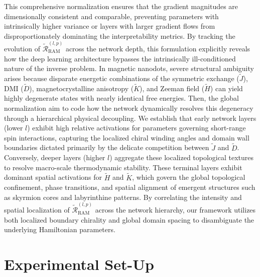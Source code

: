 \documentclass[a4paper,fleqn]{cas-sc}
\begin{document}
This comprehensive normalization ensures that the gradient magnitudes are dimensionally consistent and comparable, preventing parameters with intrinsically higher variance or layers with larger gradient flows from disproportionately dominating the interpretability metrics. By tracking the evolution of $\tilde{\mathcal{R}}_{\text{RAM}}^{(l,p)}$ across the network depth, this formulation explicitly reveals how the deep learning architecture bypasses the intrinsically ill-conditioned nature of the inverse problem. In magnetic nanodots, severe structural ambiguity arises because disparate energetic combinations of the symmetric exchange ($\tilde{J}$), DMI ($\tilde{D}$), magnetocrystalline anisotropy ($\tilde{K}$), and Zeeman field ($\tilde{H}$) can yield highly degenerate states with nearly identical free energies. Then, the global normalization aim to code how the network dynamically resolves this degeneracy through a hierarchical physical decoupling. We establish that early network layers (lower $l$) exhibit high relative activations for parameters governing short-range spin interactions, capturing the localized chiral winding angles and domain wall boundaries dictated primarily by the delicate competition between $\tilde{J}$ and $\tilde{D}$. Conversely, deeper layers (higher $l$) aggregate these localized topological textures to resolve macro-scale thermodynamic stability. These terminal layers exhibit dominant spatial activations for $\tilde{H}$ and $\tilde{K}$, which govern the global topological confinement, phase transitions, and spatial alignment of emergent structures such as skyrmion cores and labyrinthine patterns. By correlating the intensity and spatial localization of $\tilde{\mathcal{R}}_{\text{RAM}}^{(l,p)}$ across the network hierarchy, our framework utilizes both localized boundary chirality and global domain spacing to disambiguate the underlying Hamiltonian parameters.


\section{Experimental Set-Up}\label{sec:experiments}
\end{document}
